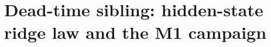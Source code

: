 %
%
\section{Dead-time sibling: hidden-state ridge law and the M1 campaign}
\label{supp:deadtime}



